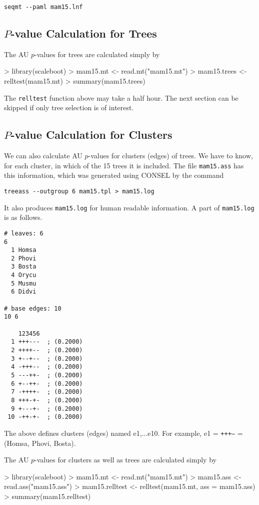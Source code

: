 \documentclass[a4paper]{amsart}
\begin{document}
\verb!seqmt --paml mam15.lnf!


\subsection{$P$-value Calculation for Trees}

The AU $p$-values for trees are calculated simply by
\begin{Schunk}
\begin{Sinput}
> library(scaleboot)
> mam15.mt <- read.mt("mam15.mt")
> mam15.trees <- relltest(mam15.mt)
> summary(mam15.trees)
\end{Sinput}
\end{Schunk}
The {\tt relltest} function above may take a half hour. The next
section can be skipped if only tree selection is of interest.

\subsection{$P$-value Calculation for Clusters}

We can also calculate AU $p$-values for clusters (edges) of trees.  We
have to know, for each cluster, in which of the 15 trees it is
included.  The file {\tt mam15.ass} has this information, which was
generated using CONSEL by the command 

\verb!treeass --outgroup 6 mam15.tpl > mam15.log!

It also produces {\tt mam15.log} for human readable information.  A
part of {\tt mam15.log} is as follows.
\begin{verbatim}
# leaves: 6
6
  1 Homsa
  2 Phovi
  3 Bosta
  4 Orycu
  5 Musmu
  6 Didvi

# base edges: 10
10 6
          
    123456
  1 +++---  ; (0.2000)
  2 ++++--  ; (0.2000)
  3 +--+--  ; (0.2000)
  4 -+++--  ; (0.2000)
  5 ---++-  ; (0.2000)
  6 +--++-  ; (0.2000)
  7 -++++-  ; (0.2000)
  8 +++-+-  ; (0.2000)
  9 +---+-  ; (0.2000)
 10 -++-+-  ; (0.2000)
\end{verbatim}
The above defines clusters (edges) named e1,...e10. For example, e1 =
{\tt +++---} = (Homsa, Phovi, Bosta).

The AU $p$-values for clusters as well as trees are calculated simply by
\begin{Schunk}
\begin{Sinput}
> library(scaleboot)
> mam15.mt <- read.mt("mam15.mt")
> mam15.ass <- read.ass("mam15.ass")
> mam15.relltest <- relltest(mam15.mt, ass = mam15.ass)
> summary(mam15.relltest)
\end{Sinput}
\end{Schunk}
\end{document}
